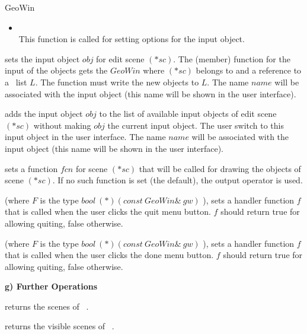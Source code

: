 \begin{ccRefClass}{GeoWin}
\begin{itemize}
        \item {} \\  
     This function is called for setting options for the input object.
\end{itemize}
     
{sets the input object $obj$ for edit scene $(*sc)$. 
The (member) function for the input of the objects gets the $GeoWin$ where $(*sc)$ belongs to and
a reference to a \leda\ list $L$. The function must write the new objects to $L$. The name $name$ will
be associated with the input object (this name will be shown in the user interface).}

  
{adds the input object $obj$ to the list of available input objects of edit scene $(*sc)$ without making 
$obj$ the current input object. The user switch to this input object in the user interface. The name $name$ will
be associated with the input object (this name will be shown in the user interface).}

\clearpage  
{}
{sets a function $fcn$ for scene $(*sc)$ that will be called for drawing the objects of scene $(*sc)$. 
If no such function is set (the default), the output operator is used.}


{
(where $F$ is the type 
$bool \ (*)(const \ GeoWin\& \ gw)$ ),
sets a handler function $f$ that is called when the user 
clicks the quit menu button. $f$ should return true for allowing quiting, false otherwise. }
  
{
(where $F$ is the type 
$bool \ (*)(const \ GeoWin\& \ gw)$ ),
sets a handler function $f$ that is called when the user clicks the
done menu button. $f$ should return true for allowing quiting, false otherwise. }

\medskip
{\bf g) Further Operations} 

{returns the scenes of \ccVar\ .}
  
{returns the visible scenes of \ccVar\ .}


\end{ccRefClass}
